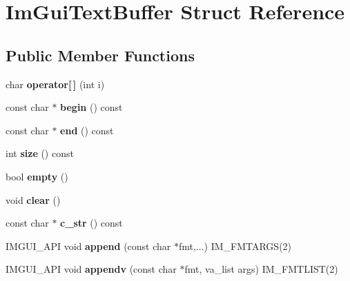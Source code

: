 \hypertarget{struct_im_gui_text_buffer}{}\section{Im\+Gui\+Text\+Buffer Struct Reference}
\label{struct_im_gui_text_buffer}
\subsection*{Public Member Functions}
\begin{DoxyCompactItemize}
\item 
\mbox{\label{struct_im_gui_text_buffer_a8550f53463fd12711e3d08b740227bd4}} 
char {\bfseries operator\mbox{[}$\,$\mbox{]}} (int i)
\item 
\mbox{\label{struct_im_gui_text_buffer_aab6d83c6b9a8061287a4cb6135c1cab4}} 
const char $\ast$ {\bfseries begin} () const
\item 
\mbox{\label{struct_im_gui_text_buffer_a2fc30ad0d384f98dfcea722f798d91f2}} 
const char $\ast$ {\bfseries end} () const
\item 
\mbox{\label{struct_im_gui_text_buffer_a2811fcd43e0224eb3bd0f3464b634289}} 
int {\bfseries size} () const
\item 
\mbox{\label{struct_im_gui_text_buffer_afdef38ae725bb5495f0143170fa902c8}} 
bool {\bfseries empty} ()
\item 
\mbox{\label{struct_im_gui_text_buffer_a9e4edc9f950bc9e35d5c3b3071dbc0df}} 
void {\bfseries clear} ()
\item 
\mbox{\label{struct_im_gui_text_buffer_afb03439bc91723e274bfb9d247a691b9}} 
const char $\ast$ {\bfseries c\+\_\+str} () const
\item 
\mbox{\label{struct_im_gui_text_buffer_a791ac3e5638c58b53772e14bee1323db}} 
I\+M\+G\+U\+I\+\_\+\+A\+PI void {\bfseries append} (const char $\ast$fmt,...) I\+M\+\_\+\+F\+M\+T\+A\+R\+GS(2)
\item 
\mbox{\label{struct_im_gui_text_buffer_ad7c7e0d7ec1a12dd2a96a3dbb204deaf}} 
I\+M\+G\+U\+I\+\_\+\+A\+PI void {\bfseries appendv} (const char $\ast$fmt, va\+\_\+list args) I\+M\+\_\+\+F\+M\+T\+L\+I\+ST(2)
\end{DoxyCompactItemize}
